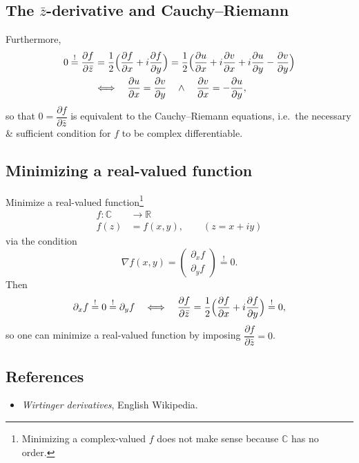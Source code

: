 \documentclass[../../main.tex]{subfiles}
\begin{document}
\subsection{The \texorpdfstring{$\bar z$}{z-bar}-derivative and Cauchy--Riemann}

Furthermore,
\begin{align}
0\overset{!}{=}\frac{\partial f}{\partial\bar z}
&=\frac12\Bigl(\frac{\partial f}{\partial x}+i\frac{\partial f}{\partial y}\Bigr)
=\frac12\Bigl(\frac{\partial u}{\partial x}+i\frac{\partial v}{\partial x}
+i\frac{\partial u}{\partial y}-\frac{\partial v}{\partial y}\Bigr)\notag\\
&\Longleftrightarrow\quad
\frac{\partial u}{\partial x}=\frac{\partial v}{\partial y}
\quad\wedge\quad
\frac{\partial v}{\partial x}=-\frac{\partial u}{\partial y},
\end{align}
so that $0=\dfrac{\partial f}{\partial\bar z}$ is equivalent to the Cauchy--Riemann equations,
i.e.\ the necessary \& sufficient condition for $f$ to be complex differentiable.

\subsection{Minimizing a real-valued function}

Minimize a real-valued function\footnote{Minimizing a complex-valued $f$ does not make sense because $\mathbb C$ has no order.} 
\begin{align}
    f\colon\mathbb C &\to \mathbb R \\ 
    f(z)&=f(x,y) , \qquad (z= x + iy)
\end{align}
via the condition
\begin{equation}
\nabla f(x,y)=\begin{pmatrix}\partial_x f\\\partial_y f\end{pmatrix}\overset{!}{=}0.
\end{equation}
Then
\begin{equation}
\partial_x f\overset{!}{=}0\overset{!}{=}\partial_y f
\quad\Longleftrightarrow\quad
\frac{\partial f}{\partial\bar z} =\frac12\Bigl(\frac{\partial f}{\partial x}+i\frac{\partial f}{\partial y}\Bigr) \overset{!}{=}0,
\end{equation}
so one can minimize a real-valued function by imposing
$\boxed{\dfrac{\partial f}{\partial\bar z}=0}$.

\subsection{References}
\begin{itemize}
\item \emph{Wirtinger derivatives}, English Wikipedia.
\end{itemize}
\end{document}

